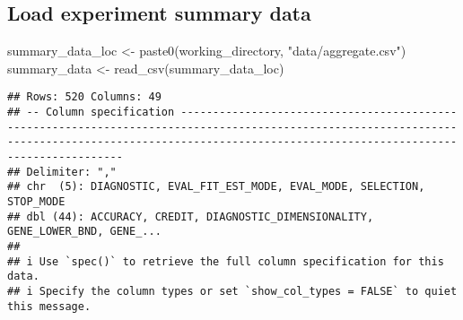 \documentclass[
]{book}
\newenvironment{Shaded}{\begin{snugshade}}{\end{snugshade}}
\newcommand{\FunctionTok}[1]{\textcolor[rgb]{0.00,0.00,0.00}{#1}}
\newcommand{\NormalTok}[1]{#1}
\newcommand{\OtherTok}[1]{\textcolor[rgb]{0.56,0.35,0.01}{#1}}
\newcommand{\StringTok}[1]{\textcolor[rgb]{0.31,0.60,0.02}{#1}}
\begin{document}
\hypertarget{load-experiment-summary-data}{%
\subsection{Load experiment summary data}\label{load-experiment-summary-data}}

\begin{Shaded}
\begin{Highlighting}[]
\NormalTok{summary\_data\_loc }\OtherTok{\textless{}{-}} \FunctionTok{paste0}\NormalTok{(working\_directory, }\StringTok{"data/aggregate.csv"}\NormalTok{)}
\NormalTok{summary\_data }\OtherTok{\textless{}{-}} \FunctionTok{read\_csv}\NormalTok{(summary\_data\_loc)}
\end{Highlighting}
\end{Shaded}

\begin{verbatim}
## Rows: 520 Columns: 49
## -- Column specification ---------------------------------------------------------------------------------------------------------------------------------------------------------------------------------------------------------
## Delimiter: ","
## chr  (5): DIAGNOSTIC, EVAL_FIT_EST_MODE, EVAL_MODE, SELECTION, STOP_MODE
## dbl (44): ACCURACY, CREDIT, DIAGNOSTIC_DIMENSIONALITY, GENE_LOWER_BND, GENE_...
## 
## i Use `spec()` to retrieve the full column specification for this data.
## i Specify the column types or set `show_col_types = FALSE` to quiet this message.
\end{verbatim}
\end{document}
